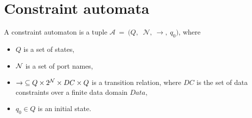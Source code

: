 
%

\section{Constraint automata}
\begin{definition} 
 \label{def:ca}
 A constraint automaton is a tuple $\mathcal{A}$$\ =\ $$($$Q,\ $
 $ \mathcal{N},\ $$\rightarrow,$$\ q_0)$, where 
 
 \begin{itemize}
 \item $Q$ is a set of states,
 
 \item $\mathcal{N}$ is a set of port names,
 
 \item $\mathord{\rightarrow} \subseteq Q \times 2^{\mathcal{N}} \times DC \times Q$ is a transition relation, where $DC$ is the set of data constraints over a finite data
 domain $\mathit{Data}$, 
 
 \item  $q_0 \in Q$ is an initial state.
 
 \end{itemize}

\end{definition}



